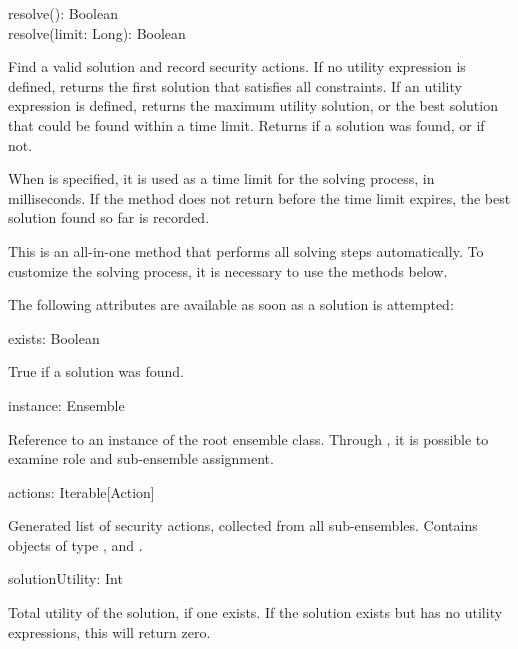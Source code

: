 \begin{dslsig}
resolve(): Boolean \\
resolve(limit: Long): Boolean
\end{dslsig}
\begin{dsldesc}
    Find a valid solution and record security actions. If no utility expression is
    defined, returns the first solution that satisfies all constraints. If an utility
    expression is defined, returns the maximum utility solution, or the best solution
    that could be found within a time limit. Returns  if a solution was found,
    or  if not.

    When  is specified, it is used as a time limit for the solving process, in
    milliseconds. If the method does not return before the time limit expires, the best
    solution found so far is recorded.

    This is an all-in-one method that performs all solving steps automatically. To
    customize the solving process, it is necessary to use the methods below.
\end{dsldesc}

\bigskip
\noindent
The following attributes are available as soon as a solution is attempted:

\begin{dslsig}
exists: Boolean
\end{dslsig}
\begin{dsldesc}
    True if a solution was found.
\end{dsldesc}

\begin{dslsig}
instance: Ensemble
\end{dslsig}
\begin{dsldesc}
    Reference to an instance of the root ensemble class. Through , it is
    possible to examine role and sub-ensemble assignment.
\end{dsldesc}

\begin{dslsig}
actions: Iterable[Action]
\end{dslsig}
\begin{dsldesc}
    Generated list of security actions, collected from all sub-ensembles. Contains
    objects of type ,  and .
\end{dsldesc}

\begin{dslsig}
solutionUtility: Int
\end{dslsig}
\begin{dsldesc}
    Total utility of the solution, if one exists. If the solution exists but has no
    utility expressions, this will return zero.
\end{dsldesc}

